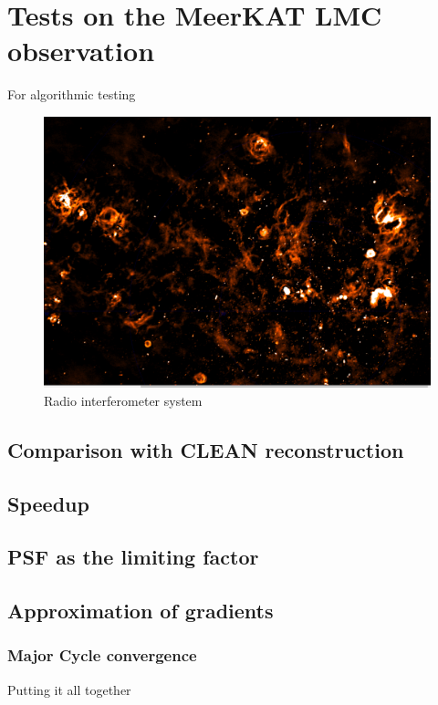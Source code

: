 \section{Tests on the MeerKAT LMC observation}\label{results}
For algorithmic testing


	
\begin{figure}[h]
	\centering
	\includegraphics[width=0.80\linewidth]{./chapters/10.results/LMC/meerkat.png}
	\caption{Radio interferometer system}
	\label{results:radio}
\end{figure}



\subsection{Comparison with CLEAN reconstruction}

\subsection{Speedup}

\subsection{PSF as the limiting factor}


\subsection{Approximation of gradients}

\subsubsection{Major Cycle convergence}
Putting it all together

